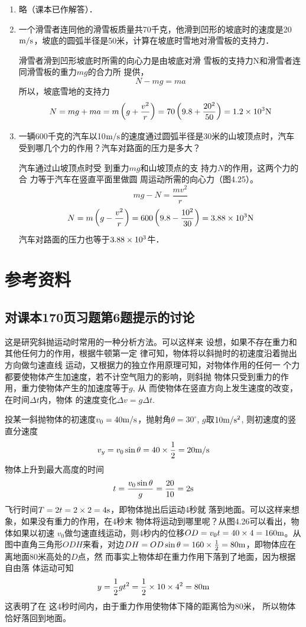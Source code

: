 \begin{enumerate}
\item  略（课本已作解答）．

\item  一个滑雪者连同他的滑雪板质量共70千克，他滑到凹形的坡底时的速度是20$\text{m}/\text{s}$，坡底的圆弧半径是50米，计算在坡底时雪地对滑雪板的支持力．

\begin{solution}
    滑雪者滑到凹形坡底时所需的向心力是由坡底对滑
    雪板的支持力N和滑雪者连同滑雪板的重力$mg$的合力所
    提供，
\[    N-mg=ma\]
    所以，坡底雪地的支持力
\[N=mg+ma=m\left(g+\frac{v^2}{r}\right)=70\left(9.8+\frac{20^2}{50}\right)=1.2\times 10^3{\rm N}\]
\end{solution}
\item  一辆600千克的汽车以10$\text{m}/\text{s}$的速度通过圆弧半径是30米的山坡顶点时，汽车受到哪几个力的作用？汽车对路面的压力是多大？


\begin{solution}
    汽车通过山坡顶点时受
    到重力$mg$和山坡顶点的支
    持力$N$的作用，这两个力的合
    力等于汽车在竖直平面里做圆
    周运动所需的向心力（图4.25）。
\[mg-N=\frac{mv^2}{r}\]
\[N=m\left(g-\frac{v^2}{r}\right)=600\left(9.8-\frac{10^2}{30}\right)=3.88\times 10^3{\rm N}\]
汽车对路面的压力也等于$3.88\times10^3$牛．
\end{solution}

\end{enumerate}


\section{参考资料}
\subsection{对课本170页习题第6题提示的讨论}
这是研究斜抛运动时常用的一种分析方法。可以这样来
设想，如果不存在重力和其他任何力的作用，根据牛顿第一定
律可知，物体将以斜抛时的初速度沿着抛出方向做匀速直线
运动，又根据力的独立作用原理可知，对物体作用的任何一
个力都要使物体产生加速度，若不计空气阻力的影响，则斜抛
物体只受到重力的作用，重力使物体产生的加速度等于$g$, 从
而使物体在竖直方向上发生速度的改变，在时间$\Delta t$内，物体
的速度变化$\Delta v=g\Delta t$.

投某一斜抛物体的初速度$v_0=40\text{m}/\text{s}$，抛射角$\theta=30^{\circ}$,
$g$取$10\text{m}/\text{s}^2$, 则初速度的竖直分速度
$$v_y=v_0\sin\theta=40\times\frac{1}{2}=20\text{m}/\text{s}$$
物体上升到最大高度的时间
\[t=\frac{v_0\sin\theta}{g}=\frac{20}{10}=2{\rm s}\]
飞行时间$T=2t=2\times2=4{\rm s}$，即物体抛出后运动4秒就
落到地面。可以这样来想象，如果没有重力的作用，在4秒末
物体将运动到哪里呢？从图4.26可以看出，物体如果以初速
$v_0$做匀速直线运动，则4秒内的位移$OD=v_0t=40\times4=
160{\rm m}$。从图中直角三角形$ODH$来看，对边$DH=OD\sin\theta=
160\times\frac{1}{2}=80{\rm m}$，即物体应在离地面80米高处的$D$点，然
而事实上物体却在重力作用下落到了地面，因为根据自由落
体运动可知
\[y=\frac{1}{2}gt^2=\frac{1}{2}\times 10\times 4^2=80{\rm m}\]
这表明了在
这4秒时间内，由于重力作用使物体下降的距离恰为80米，
所以物体恰好落回到地面。

